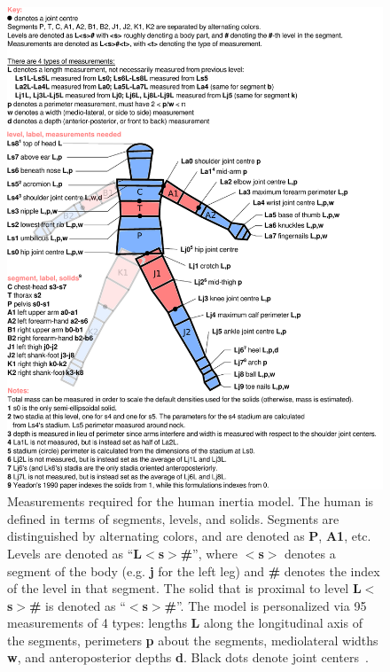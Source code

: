 \documentclass[10pt,a4paper,twocolumn]{article}
\begin{document}
\begin{figure}
  \begin{center}
    \includegraphics[width=1.6\columnwidth]{figures/measurements.pdf}
  \end{center}
  \caption{
    Measurements required for the human inertia model. The human is
    defined in terms of segments, levels, and solids. Segments are distinguished by
    alternating colors, and are denoted as \textbf{P}, \textbf{A1}, etc. Levels
    are denoted as ``\textbf{L$<$s$>$\#}'', where \textbf{$<$s$>$} denotes a
    segment of the body (e.g. \textbf{j} for the left leg) and \textbf{\#} denotes
    the index of the level in that segment. The solid that is proximal to level
    \textbf{L$<$s$>$\#} is denoted as ``\textbf{$<$s$>$\#}''. The model is
    personalized via 95 measurements of 4 types: lengths
    \textbf{L} along the longitudinal axis of the segments, perimeters
    \textbf{p} about the segments, mediolateral widths \textbf{w}, and
    anteroposterior depths \textbf{d}. Black dots denote joint centers~\cite{Yeadon1990c}.
  }
  \label{fig:meas}
\end{figure}
\end{document}
